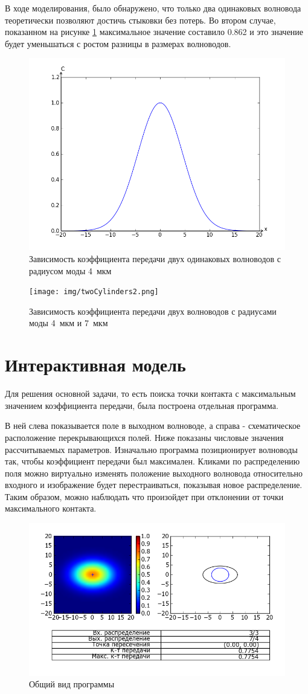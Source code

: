 В ходе моделирования, было обнаружено, что только два одинаковых волновода теоретически позволяют достичь стыковки без потерь. Во втором случае, показанном на рисунке \ref{twoCylinders2} максимальное значение составило 0.862 и это значение будет уменьшаться с ростом разницы в размерах волноводов.

\begin{figure}[h!]
		\includegraphics[width=0.5\linewidth]{img/twoCylinders.png}
		\caption{Зависимость коэффициента передачи двух одинаковых волноводов с радиусом моды 4~мкм}
\end{figure}
\begin{figure}[h!]
		\texttt{[image: img/twoCylinders2.png]}
		\caption{Зависимость коэффициента передачи двух волноводов с радиусами моды 4~мкм и 7~мкм}
		\label{twoCylinders2}
\end{figure}

\newpage
\section{Интерактивная модель}
Для решения основной задачи, то есть поиска точки контакта с максимальным значением коэффициента передачи, была построена отдельная программа.

В ней слева показывается поле в выходном волноводе, а справа - схематическое расположение перекрывающихся полей. Ниже показаны числовые значения рассчитываемых параметров. Изначально программа позиционирует волноводы так, чтобы коэффициент передачи был максимален. Кликами по распределению поля можно виртуально изменять положение выходного волновода относительно входного и изображение будет перестраиваться, показывая новое распределение. Таким образом, можно наблюдать что произойдет при отклонении от точки максимального контакта.

\begin{figure}[h!]
	\includegraphics[width=\linewidth]{img/heatmap.png}
	\caption{Общий вид программы}
\end{figure}